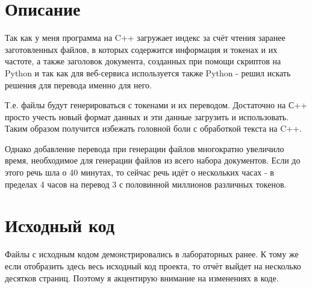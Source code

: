 \section{Описание}

Так как у меня программа на C++ загружает индекс за счёт чтения заранее заготовленных файлов, в которых содержится информация и токенах и их частоте, а также заголовок документа, созданных при помощи скриптов на Python и так как для веб-сервиса используется также Python - решил искать решения для перевода именно для него.

Т.е. файлы будут генерироваться с токенами и их переводом. Достаточно на С++ просто учесть новый формат данных и эти данные загрузить и использовать. Таким образом получится избежать головной боли с обработкой текста на C++.

Однако добавление перевода при генерации файлов многократно увеличило время, необходимое для генерации файлов из всего набора документов. Если до этого речь шла о 40 минутах, то сейчас речь идёт о нескольких часах - в пределах 4 часов на перевод 3 с половинной миллионов различных токенов.

\lstset{extendedchars=\true}
\section{Исходный код}

Файлы с исходным кодом демонстрировались в лабораторных ранее. К тому же если отобразить здесь весь исходный код проекта, то отчёт выйдет на несколько десятков страниц. Поэтому я акцентирую внимание на изменениях в коде.

